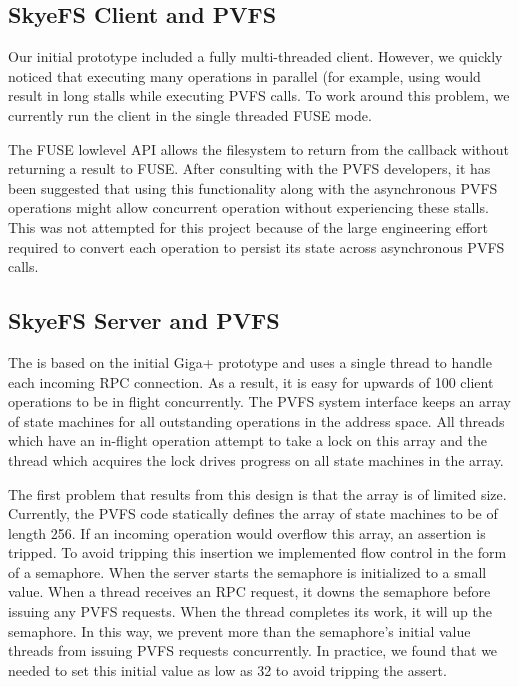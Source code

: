 \documentclass[onecolumn, 11pt, letterpaper]{article}
\begin{document}
\subsection{SkyeFS Client and PVFS}
Our initial prototype included a fully multi-threaded client.  However, we
quickly noticed that executing many operations in parallel (for example,
using  would result in long stalls while executing PVFS calls.
To work around this problem, we currently run the client in the single
threaded FUSE mode.

The FUSE lowlevel API allows the filesystem to return from the callback
without returning a result to FUSE.  After consulting with the PVFS
developers, it has been suggested that using this functionality along with the
asynchronous PVFS operations might allow concurrent operation without
experiencing these stalls.  This was not attempted for this project because of
the large engineering effort required to convert each operation to persist its
state across asynchronous PVFS calls.

\subsection{SkyeFS Server and PVFS}
The  is based on the initial Giga+ prototype and uses a
single thread to handle each incoming RPC connection.  As a result, it is easy
for upwards of 100 client operations to be in flight concurrently.  The PVFS
system interface keeps an array of state machines for all outstanding
operations in the address space.  All threads which have an in-flight
operation attempt to take a lock on this array and the thread which acquires
the lock drives progress on all state machines in the array.

The first problem that results from this design is that the array is of
limited size.  Currently, the PVFS code statically defines the array of state
machines to be of length 256.  If an incoming operation would overflow this
array, an assertion is tripped.  To avoid tripping this insertion we
implemented flow control in the form of a semaphore.  When the server starts
the semaphore is initialized to a small value.  When a thread receives an RPC
request, it downs the semaphore before issuing any PVFS requests.  When the
thread completes its work, it will up the semaphore.  In this way, we prevent
more than the semaphore's initial value threads from issuing PVFS requests
concurrently.  In practice, we found that we needed to set this initial value
as low as 32 to avoid tripping the assert.
\end{document}

